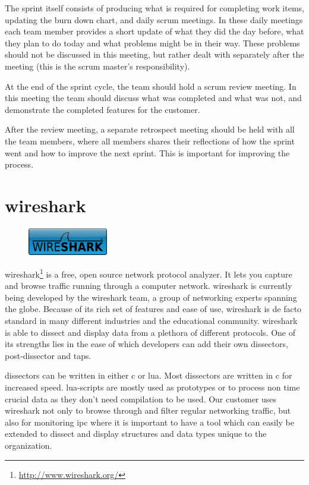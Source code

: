 The sprint itself consists of producing what is required for completing work
items, updating the burn down chart, and daily \Gls{scrum} meetings. In these daily
meetings each team member provides a short update of what they did the day
before, what they plan to do today and what problems might be in their way.
These problems should not be discussed in this meeting, but rather dealt with
separately after the meeting (this is the \Gls{scrum} master's responsibility).

At the end of the sprint cycle, the team should hold a \Gls{scrum} review meeting.
In this meeting the team should discuss what was completed and what was not, and
demonstrate the completed features for the customer.	

After the review meeting, a separate retrospect meeting should be held with all
the team members, where all members shares their reflections of how the sprint
went and how to improve the next sprint. This is important for improving the
process.


\section{\Gls{wireshark}}
\label{sec:pre:wireshark}
\begin{figure}
	\vspace{-10pt}
	\includegraphics[width=3.5cm]{./planning/img/wireshark_logo}
	\vspace{-20pt}
\end{figure}
\Gls{wireshark}\footnote{\url{http://www.wireshark.org/}} is a free, open source
network \gls{protocol} analyzer. It lets you capture and browse traffic running
through a computer network. \Gls{wireshark} is currently being developed by the
\Gls{wireshark} team, a group of networking experts spanning the globe. Because of
its rich set of features and ease of use, \Gls{wireshark} is de facto standard in
many different industries and the educational community. \Gls{wireshark} is able to
dissect and display data from a plethora of different \glspl{protocol}. One of its
strengths lies in the ease of which developers can add their own \glspl{dissector},
\gls{post-dissector} and taps.

\Glspl{dissector} can be written in either \Gls{c} or \Gls{lua}. Most \glspl{dissector} are written in \Gls{c}
for increased speed. \Gls{lua}-scripts are mostly used as prototypes or to process
non time crucial data as they don't need compilation to be used. Our customer
uses \Gls{wireshark} not only to browse through and filter regular networking
traffic, but also for monitoring \gls{ipc} where it is
important to have a tool which can easily be extended to dissect and display
structures and data types unique to the organization.


